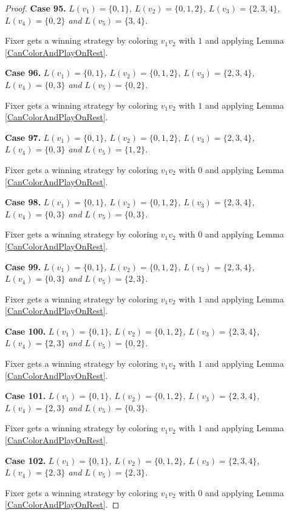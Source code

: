 \documentclass[12pt]{amsart}
\theoremstyle{plain}
\theoremstyle{definition}
\theoremstyle{remark}
\begin{document}
\begin{proof}
\noindent\textbf{Case 95.  }\textit{$L(v_1) = \{0, 1\}$, $L(v_2) = \{0, 1, 2\}$, $L(v_3) = \{2, 3, 4\}$, $L(v_4) = \{0, 2\}$ and $L(v_5) = \{3, 4\}$.}

Fixer gets a winning strategy by coloring $v_1v_2$ with $1$ and applying Lemma \ref{CanColorAndPlayOnRest}.

\noindent\textbf{Case 96.  }\textit{$L(v_1) = \{0, 1\}$, $L(v_2) = \{0, 1, 2\}$, $L(v_3) = \{2, 3, 4\}$, $L(v_4) = \{0, 3\}$ and $L(v_5) = \{0, 2\}$.}

Fixer gets a winning strategy by coloring $v_1v_2$ with $1$ and applying Lemma \ref{CanColorAndPlayOnRest}.

\noindent\textbf{Case 97.  }\textit{$L(v_1) = \{0, 1\}$, $L(v_2) = \{0, 1, 2\}$, $L(v_3) = \{2, 3, 4\}$, $L(v_4) = \{0, 3\}$ and $L(v_5) = \{1, 2\}$.}

Fixer gets a winning strategy by coloring $v_1v_2$ with $0$ and applying Lemma \ref{CanColorAndPlayOnRest}.

\noindent\textbf{Case 98.  }\textit{$L(v_1) = \{0, 1\}$, $L(v_2) = \{0, 1, 2\}$, $L(v_3) = \{2, 3, 4\}$, $L(v_4) = \{0, 3\}$ and $L(v_5) = \{0, 3\}$.}

Fixer gets a winning strategy by coloring $v_1v_2$ with $0$ and applying Lemma \ref{CanColorAndPlayOnRest}.

\noindent\textbf{Case 99.  }\textit{$L(v_1) = \{0, 1\}$, $L(v_2) = \{0, 1, 2\}$, $L(v_3) = \{2, 3, 4\}$, $L(v_4) = \{0, 3\}$ and $L(v_5) = \{2, 3\}$.}

Fixer gets a winning strategy by coloring $v_1v_2$ with $1$ and applying Lemma \ref{CanColorAndPlayOnRest}.

\noindent\textbf{Case 100.  }\textit{$L(v_1) = \{0, 1\}$, $L(v_2) = \{0, 1, 2\}$, $L(v_3) = \{2, 3, 4\}$, $L(v_4) = \{2, 3\}$ and $L(v_5) = \{0, 2\}$.}

Fixer gets a winning strategy by coloring $v_1v_2$ with $1$ and applying Lemma \ref{CanColorAndPlayOnRest}.

\noindent\textbf{Case 101.  }\textit{$L(v_1) = \{0, 1\}$, $L(v_2) = \{0, 1, 2\}$, $L(v_3) = \{2, 3, 4\}$, $L(v_4) = \{2, 3\}$ and $L(v_5) = \{0, 3\}$.}

Fixer gets a winning strategy by coloring $v_1v_2$ with $1$ and applying Lemma \ref{CanColorAndPlayOnRest}.

\noindent\textbf{Case 102.  }\textit{$L(v_1) = \{0, 1\}$, $L(v_2) = \{0, 1, 2\}$, $L(v_3) = \{2, 3, 4\}$, $L(v_4) = \{2, 3\}$ and $L(v_5) = \{2, 3\}$.}

Fixer gets a winning strategy by coloring $v_1v_2$ with $0$ and applying Lemma \ref{CanColorAndPlayOnRest}.


\end{proof}
\end{document}
